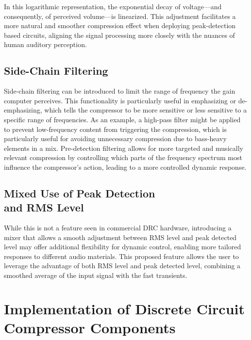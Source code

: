 \documentclass[10pt]{article}
\begin{document}
\begin{multicols*}{2}
                \noindent In this logarithmic representation, the exponential decay of voltage—and consequently, of perceived volume—is linearized. This adjustment facilitates a more natural and smoother compression effect when deploying peak-detection based circuits, aligning the signal processing more closely with the nuances of human auditory perception. 
                
            \subsection{Side-Chain Filtering}
                Side-chain filtering can be introduced to limit the range of frequency the gain computer perceives. This functionality is particularly useful in emphasizing or de-emphasizing, which tells the compressor to be more sensitive or less sensitive to a specific range of frequencies. As an example, a high-pass filter might be applied to prevent low-frequency content from triggering the compression, which is particularly useful for avoiding unnecessary compression due to bass-heavy elements in a mix. Pre-detection filtering allows for more targeted and musically relevant compression by controlling which parts of the frequency spectrum most influence the compressor's action, leading to a more controlled dynamic response.\cite{side-chain-filtering}
                
            \subsection[Mixed Use of Peak Detection and RMS Level]{Mixed Use of Peak Detection\\and RMS Level} \label{sect:rms-peak-mix}
                While this is not a feature seen in commercial DRC hardware, introducing a mixer that allows a smooth adjustment between RMS level and peak detected level may offer additional flexibility for dynamic control, enabling more tailored responses to different audio materials.
                This proposed feature allows the user to leverage the advantage of both RMS level and peak detected level, combining a smoothed average of the input signal with the fast transients.
            
        \section{Implementation of Discrete Circuit Compressor Components}


\end{multicols*}
\end{document}
